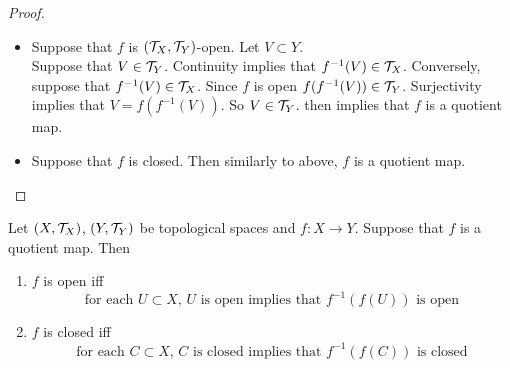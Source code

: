 \documentclass{book}
\begin{document}
	\begin{proof}\
	\begin{itemize}	
	\item Suppose that $f$ is $(\mathcal{T}_X, \mathcal{T}_Y)$-open. Let $V \subset Y$. \\
	Suppose that $V \in \mathcal{T}_Y$. Continuity implies that $f^{-1}(V) \in \mathcal{T}_X$. Conversely, suppose that $f^{-1}(V) \in \mathcal{T}_X$. Since $f$ is open $f(f^{-1}(V)) \in \mathcal{T}_Y$. Surjectivity implies that $V = f(f^{-1}(V))$. So $V \in \mathcal{T}_Y$.  then implies that $f$ is a quotient map.\\
	\item   
	Suppose that $f$ is closed. Then similarly to above, $f$ is a quotient map.
	\end{itemize}
	\end{proof}
	
	\begin{ex} 
	Let $(X, \mathcal{T}_X)$, $(Y, \mathcal{T}_Y)$ be topological spaces and $f:X \rightarrow Y$. Suppose that $f$ is a quotient map. Then 
	\begin{enumerate}
		\item $f$ is open iff 
		$$\text{for each $U \subset X$, $U$ is open implies that $f^{-1}(f(U))$ is open} $$
		\item $f$ is closed iff 
		$$\text{for each $C \subset X$, $C$ is closed implies that $f^{-1}(f(C))$ is closed} $$
	\end{enumerate}
	\end{ex}
	
\end{document}
